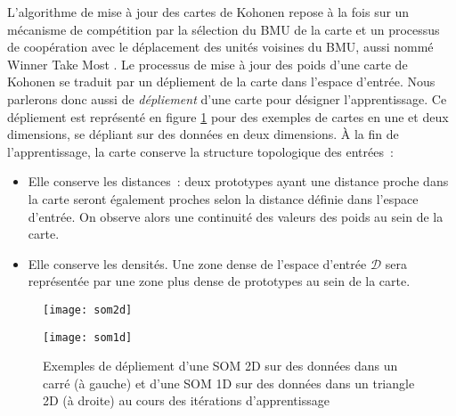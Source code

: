 \documentclass[../main]{subfiles}
\begin{document}
L'algorithme de mise à jour des cartes de Kohonen repose à la fois sur un mécanisme de compétition par la sélection du BMU de la carte et un processus de coopération avec le déplacement des unités voisines du BMU, aussi nommé \og Winner Take Most \fg{}.
Le processus de mise à jour des poids d'une carte de Kohonen se traduit par un dépliement de la carte dans l'espace d'entrée. Nous parlerons donc aussi de \emph{dépliement} d'une carte pour désigner l'apprentissage. Ce dépliement est représenté en figure \ref{fig:som1d} pour des exemples de cartes en une et deux dimensions, se dépliant sur des données en deux dimensions.
\`A la fin de l'apprentissage, la carte conserve la structure topologique des entrées~:
\begin{itemize}
\item Elle conserve les distances~: deux prototypes ayant une distance proche dans la carte seront également proches selon la distance définie dans l'espace d'entrée. On observe alors une continuité des valeurs des poids au sein de la carte.
\item Elle conserve les densités. Une zone dense de l'espace d'entrée $\mathcal{D}$ sera représentée par une zone plus dense de prototypes au sein de la carte.
\end{itemize}
\begin{figure}
    \begin{minipage}{0.5\textwidth}
    \centering
    \texttt{[image: som2d]}
    \end{minipage}
    \begin{minipage}{0.5\textwidth}
    \centering
    \texttt{[image: som1d]}
    \end{minipage}
    \caption{Exemples de dépliement d'une SOM 2D sur des données dans un carré (à gauche) et d'une SOM 1D sur des données dans un triangle 2D (à droite) au cours des itérations d'apprentissage \parencite{Kohonen1995SelfOrganizingM}\label{fig:som1d}}
    \end{figure}
\end{document}
